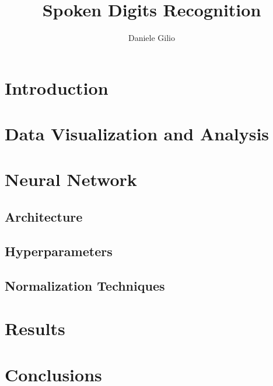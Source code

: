 \documentclass[10pt,a4paper]{report}
\author{Daniele Gilio}
\title{Spoken Digits Recognition}
\begin{document}
\maketitle
\section{Introduction}
\section{Data Visualization and Analysis}
\section{Neural Network}
\subsection{Architecture}
\subsection{Hyperparameters}
\subsection{Normalization Techniques}
\section{Results}
\section{Conclusions}
\end{document}
